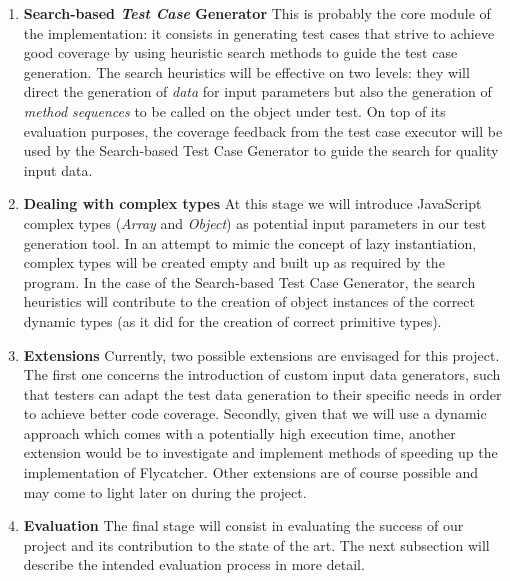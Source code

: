 \documentclass[a4paper,11pt,titlepage]{report}
\begin{document}
\begin{enumerate}

	\item{\textbf{Search-based \emph{Test Case} Generator}} This is probably the core module of the implementation: it consists in generating test cases that strive to achieve good coverage by using heuristic search methods to guide the test case generation. The search heuristics will be effective on two levels: they will direct the generation of \emph{data} for input parameters but also the generation of \emph{method sequences} to be called on the object under test. On top of its evaluation purposes, the coverage feedback from the test case executor will be used by the Search-based Test Case Generator to guide the search for quality input data.

	\item{\textbf{Dealing with complex types}}
At this stage we will introduce JavaScript complex types (\emph{Array} and \emph{Object}) as potential input parameters in our test generation tool. In an attempt to mimic the concept of lazy instantiation, complex types will be created empty and built up as required by the program. In the case of the Search-based Test Case Generator, the search heuristics will contribute to the creation of object instances of the correct dynamic types (as it did for the creation of correct primitive types).
		
	\item{\textbf{Extensions}} Currently, two possible extensions are envisaged for this project. The first one concerns the introduction of custom input data generators, such that testers can adapt the test data generation to their specific needs in order to achieve better code coverage. Secondly, given that we will use a dynamic approach which comes with a potentially high execution time, another extension would be to investigate and implement methods of speeding up the implementation of Flycatcher. Other extensions are of course possible and may come to light later on during the project.
		
	\item{\textbf{Evaluation}}
	The final stage will consist in evaluating the success of our project and its contribution to the state of the art. The next subsection will describe the intended evaluation process in more detail.

\end{enumerate}
\end{document}
